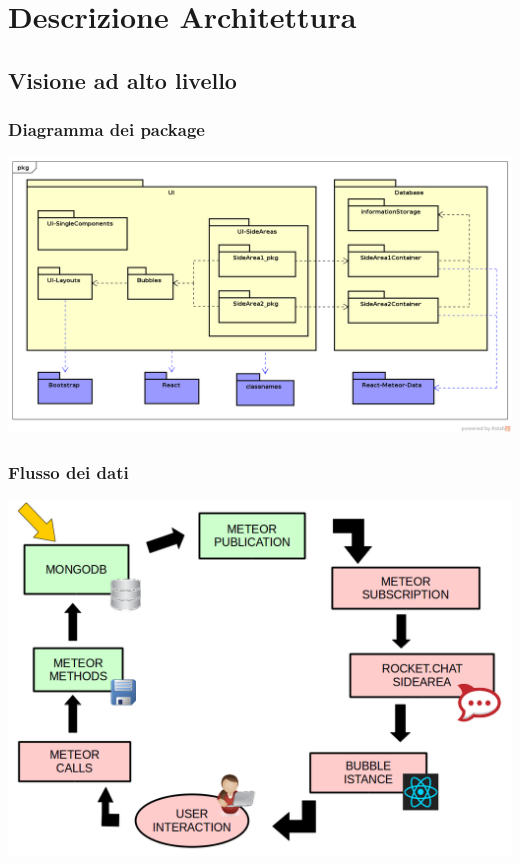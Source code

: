 
\section{Descrizione Architettura}
\subsection{Visione ad alto livello}
\begin{frame}
  \frametitle{Diagramma dei package}
  \begin{center}
    \includegraphics[scale=0.30]{img/General.png}
  \end{center}
\end{frame}


\begin{frame}
  \frametitle{Flusso dei dati }
  \begin{center}
    \includegraphics[scale=0.30]{img/2flussodati.png}
  \end{center}
\end{frame}


